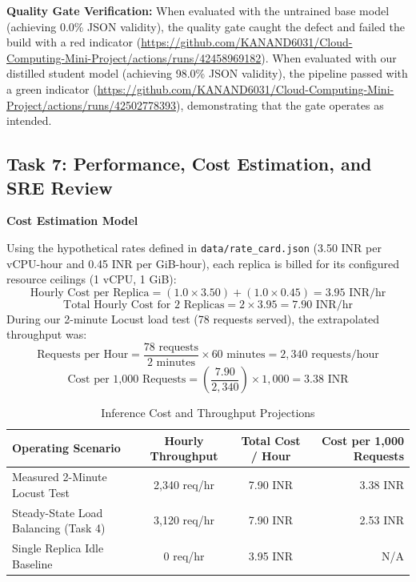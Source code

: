 \documentclass[10pt,a4paper]{article}
\begin{document}
\textbf{Quality Gate Verification:} When evaluated with the untrained base model (achieving 0.0\% JSON validity), the quality gate caught the defect and failed the build with a red indicator (\url{https://github.com/KANAND6031/Cloud-Computing-Mini-Project/actions/runs/42458969182}). When evaluated with our distilled student model (achieving 98.0\% JSON validity), the pipeline passed with a green indicator (\url{https://github.com/KANAND6031/Cloud-Computing-Mini-Project/actions/runs/42502778393}), demonstrating that the gate operates as intended.

\subsection*{Task 7: Performance, Cost Estimation, and SRE Review}

\textbf{Cost Estimation Model}

Using the hypothetical rates defined in \texttt{data/rate\_card.json} (3.50 INR per vCPU-hour and 0.45 INR per GiB-hour), each replica is billed for its configured resource ceilings (1 vCPU, 1 GiB):
\begin{equation*}
\text{Hourly Cost per Replica} = (1.0 \times 3.50) + (1.0 \times 0.45) = 3.95\text{ INR/hr}
\end{equation*}
\begin{equation*}
\text{Total Hourly Cost for 2 Replicas} = 2 \times 3.95 = 7.90\text{ INR/hr}
\end{equation*}
During our 2-minute Locust load test (78 requests served), the extrapolated throughput was:
\begin{equation*}
\text{Requests per Hour} = \frac{78\text{ requests}}{2\text{ minutes}} \times 60\text{ minutes} = 2,340\text{ requests/hour}
\end{equation*}
\begin{equation*}
\text{Cost per 1,000 Requests} = \left(\frac{7.90}{2,340}\right) \times 1,000 = 3.38\text{ INR}
\end{equation*}

\begin{table}[h!]
\centering
\small
\begin{tabular}{lccr}
\toprule
\textbf{Operating Scenario} & \textbf{Hourly Throughput} & \textbf{Total Cost / Hour} & \textbf{Cost per 1,000 Requests} \\
\midrule
Measured 2-Minute Locust Test & 2,340 req/hr & 7.90 INR & 3.38 INR \\
Steady-State Load Balancing (Task 4) & 3,120 req/hr & 7.90 INR & 2.53 INR \\
Single Replica Idle Baseline & 0 req/hr & 3.95 INR & N/A \\
\bottomrule
\end{tabular}
\caption{Inference Cost and Throughput Projections}
\label{tab:task7_cost}
\end{table}
\end{document}
